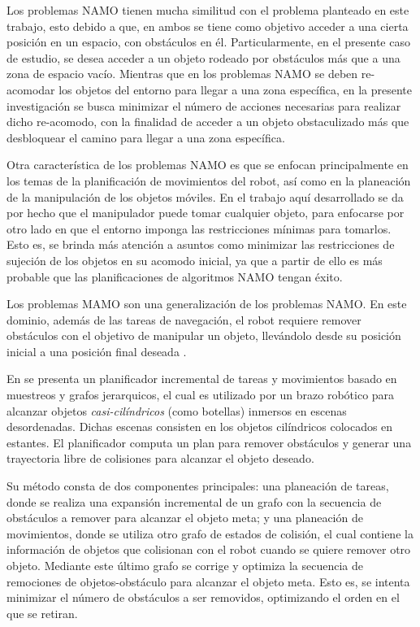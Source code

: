 %
Los problemas NAMO tienen mucha similitud con el problema planteado en este trabajo, esto debido a que, en ambos se tiene como objetivo acceder a una cierta posición en un espacio, con obstáculos en él. 
Particularmente, en el presente caso de estudio, se desea acceder a un objeto rodeado por obstáculos más que a una zona de espacio vacío.
Mientras que en los problemas NAMO se deben re-acomodar los objetos del entorno para llegar a una zona específica, en la presente investigación se busca minimizar el número de acciones necesarias para realizar dicho re-acomodo, con la finalidad de acceder a un objeto obstaculizado más que desbloquear el camino para llegar a una zona específica.

Otra característica de los problemas NAMO es que se enfocan principalmente en los temas de la planificación de movimientos del robot, así como en la planeación de la manipulación de los objetos móviles.
En el trabajo aquí desarrollado se da por hecho que el manipulador puede tomar cualquier objeto, para enfocarse por otro lado en que el entorno imponga las restricciones mínimas para tomarlos.
Esto es, se brinda más atención a asuntos como minimizar las restricciones de sujeción de los objetos en su acomodo inicial, ya que a partir de ello es más probable que las planificaciones de algoritmos NAMO tengan éxito. 
%
%
%
%

Los problemas MAMO son una generalización de los problemas NAMO.
En este dominio, además de las tareas de navegación, el robot requiere remover obstáculos con el objetivo de manipular un objeto, llevándolo desde su posición inicial a una posición final deseada \cite{4209604}.

En \cite{9863895} se presenta un planificador incremental de tareas y movimientos basado en muestreos y grafos jerarquicos, el cual es utilizado por un brazo robótico  para alcanzar objetos \textsl{casi-cilíndricos} (como botellas) inmersos en escenas desordenadas.
Dichas escenas consisten en los objetos cilíndricos colocados en estantes.
El planificador computa un plan para remover obstáculos y generar una trayectoria libre de colisiones para alcanzar el objeto deseado.

Su método consta de dos componentes principales: una planeación de tareas, donde se realiza una expansión incremental de un grafo con la secuencia de obstáculos a remover para alcanzar el objeto meta; y una planeación de movimientos, donde se utiliza otro grafo de estados de colisión, el cual contiene la información de objetos que colisionan con el robot cuando se quiere remover otro objeto.
Mediante este último grafo se corrige y optimiza la secuencia de remociones de objetos-obstáculo para alcanzar el objeto meta.
Esto es, se intenta minimizar el número de obstáculos a ser removidos, optimizando el orden en el que se retiran.

